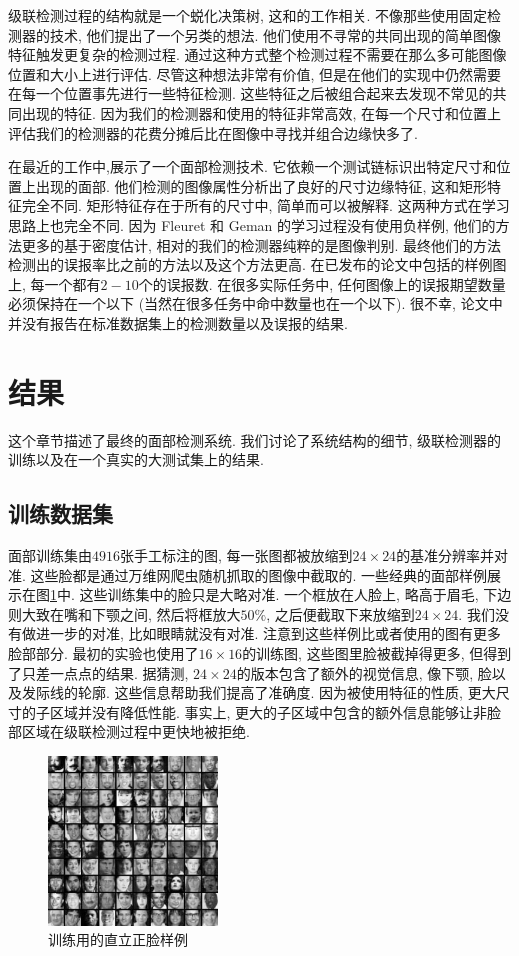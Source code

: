 \documentclass[a4paper,utf8,11pt]{ctexart}
\begin{document}
级联检测过程的结构就是一个蜕化决策树, 这和\citet{amit1999computational}的工作相关. 不像那些使用固定检测器的技术, 他们提出了一个另类的想法. 他们使用不寻常的共同出现的简单图像特征触发更复杂的检测过程.
通过这种方式整个检测过程不需要在那么多可能图像位置和大小上进行评估. 尽管这种想法非常有价值, 但是在他们的实现中仍然需要在每一个位置事先进行一些特征检测. 这些特征之后被组合起来去发现不常见的共同出现的特征. 因为我们的检测器和使用的特征非常高效, 在每一个尺寸和位置上评估我们的检测器的花费分摊后比在图像中寻找并组合边缘快多了.

在最近的工作中,\citet{fleuret2001coarse}展示了一个面部检测技术. 它依赖一个测试链标识出特定尺寸和位置上出现的面部. 他们检测的图像属性分析出了良好的尺寸边缘特征, 这和矩形特征完全不同. 矩形特征存在于所有的尺寸中, 简单而可以被解释. 这两种方式在学习思路上也完全不同.
因为 Fleuret 和 Geman 的学习过程没有使用负样例, 他们的方法更多的基于密度估计, 相对的我们的检测器纯粹的是图像判别. 最终他们的方法检测出的误报率比之前\citet{rowley1998neural}的方法以及这个方法更高. 在已发布的论文中包括的样例图上, 每一个都有$2-10$个的误报数. 在很多实际任务中, 任何图像上的误报期望数量必须保持在一个以下 (当然在很多任务中命中数量也在一个以下). 很不幸, 论文中并没有报告在标准数据集上的检测数量以及误报的结果.
\section{结果}\label{sec:result}
这个章节描述了最终的面部检测系统. 我们讨论了系统结构的细节, 级联检测器的训练以及在一个真实的大测试集上的结果.
\subsection{训练数据集}
面部训练集由$4916$张手工标注的图, 每一张图都被放缩到$24\times24$的基准分辨率并对准. 这些脸都是通过万维网爬虫随机抓取的图像中截取的. 一些经典的面部样例展示在图\ref{fig:face_used}中. 这些训练集中的脸只是大略对准. 一个框放在人脸上, 略高于眉毛, 下边则大致在嘴和下颚之间, 然后将框放大$50\%$, 之后便截取下来放缩到$24\times24$. 我们没有做进一步的对准, 比如眼睛就没有对准. 注意到这些样例比\citet{rowley1998neural}或者\citet{sung1998example}使用的图有更多脸部部分. 最初的实验也使用了$16\times16$的训练图, 这些图里脸被截掉得更多, 但得到了只差一点点的结果. 据猜测, $24\times24$的版本包含了额外的视觉信息, 像下颚, 脸以及发际线的轮廓. 这些信息帮助我们提高了准确度. 因为被使用特征的性质, 更大尺寸的子区域并没有降低性能. 事实上, 更大的子区域中包含的额外信息能够让非脸部区域在级联检测过程中更快地被拒绝.
\begin{figure}
\centering
\includegraphics[width=0.4\textwidth]{face_used.png}
\caption{训练用的直立正脸样例}
\label{fig:face_used}
\end{figure}
\end{document}
